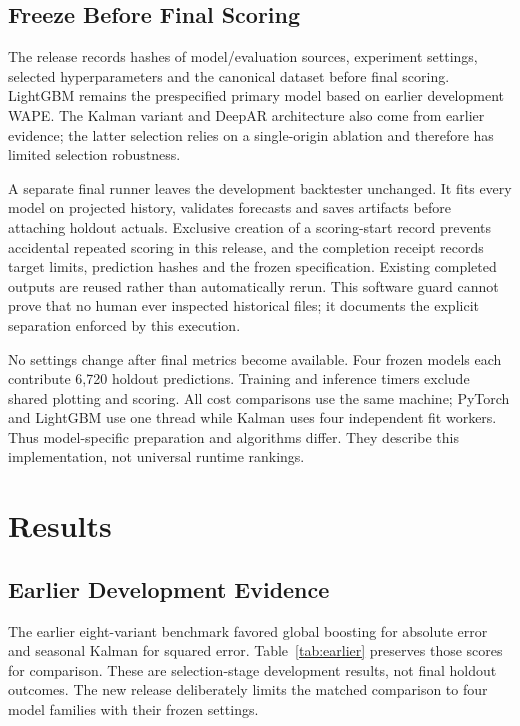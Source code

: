 \documentclass[conference]{IEEEtran}
\begin{document}
\subsection{Freeze Before Final Scoring}
The release records hashes of model/evaluation sources, experiment settings, selected hyperparameters and the canonical dataset before final scoring. LightGBM remains the prespecified primary model based on earlier development WAPE. The Kalman variant and DeepAR architecture also come from earlier evidence; the latter selection relies on a single-origin ablation and therefore has limited selection robustness.

A separate final runner leaves the development backtester unchanged. It fits every model on projected history, validates forecasts and saves artifacts before attaching holdout actuals. Exclusive creation of a scoring-start record prevents accidental repeated scoring in this release, and the completion receipt records target limits, prediction hashes and the frozen specification. Existing completed outputs are reused rather than automatically rerun. This software guard cannot prove that no human ever inspected historical files; it documents the explicit separation enforced by this execution.

No settings change after final metrics become available. Four frozen models each contribute 6,720 holdout predictions. Training and inference timers exclude shared plotting and scoring. All cost comparisons use the same machine; PyTorch and LightGBM use one thread while Kalman uses four independent fit workers. Thus model-specific preparation and algorithms differ. They describe this implementation, not universal runtime rankings.

\section{Results}
\subsection{Earlier Development Evidence}
The earlier eight-variant benchmark favored global boosting for absolute error and seasonal Kalman for squared error. Table~\ref{tab:earlier} preserves those scores for comparison. These are selection-stage development results, not final holdout outcomes. The new release deliberately limits the matched comparison to four model families with their frozen settings.
\end{document}
